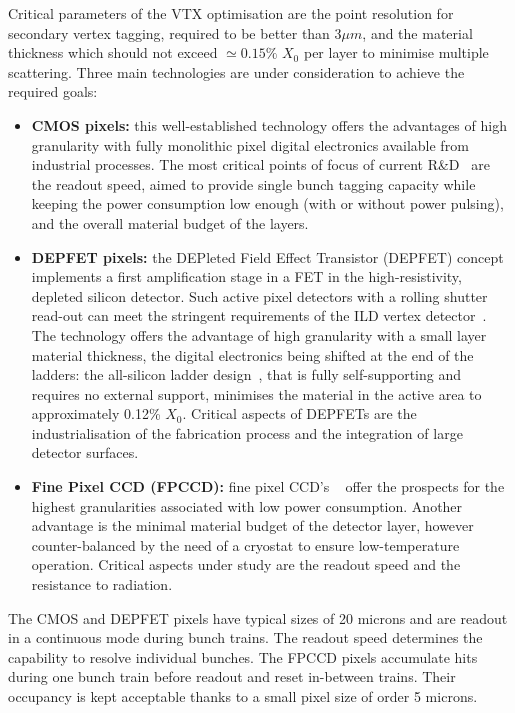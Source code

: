 Critical parameters of the VTX optimisation are the point resolution for secondary vertex tagging, required to be better than 3$\mu m$, and the material thickness which should not exceed $\simeq 0.15\%$ $X_0$ per layer to minimise multiple scattering. Three main technologies are under consideration to achieve the required goals:
\begin{itemize}
    \item {\bf CMOS pixels:} this well-established technology offers the advantages of high granularity with fully monolithic pixel digital electronics available from industrial processes. The most critical points of focus of current R\&D~\cite{Besson:2016ivb} are the readout speed, aimed to provide single bunch tagging capacity while keeping the power consumption low enough (with or without power pulsing), and the overall material budget of the layers.
    \item {\bf DEPFET pixels:} the DEPleted Field Effect Transistor (DEPFET) concept implements a first amplification stage in a FET in the high-resistivity, depleted silicon detector. Such active pixel detectors with a rolling shutter read-out can meet the stringent requirements of the ILD vertex detector~\cite{Alonso:2012ss,Richter:2003dn}. The technology offers the advantage of high granularity with a small layer material thickness, the digital electronics being shifted at the end of the ladders: the all-silicon ladder design~\cite{Andricek:2004cj}, that is fully self-supporting and requires no external support, minimises the material in the active area to approximately 0.12\% $X_{0}$. Critical aspects of DEPFETs are the industrialisation of the fabrication process and the integration of large detector surfaces.
    \item{\bf Fine Pixel CCD (FPCCD):} fine pixel CCD's ~\cite{Paredes:2014kda} offer the prospects for the highest granularities associated with low power consumption. Another advantage is the minimal material budget of the detector layer, however counter-balanced by the need of a cryostat to ensure low-temperature operation. Critical aspects under study are the readout speed and the resistance to radiation.  
\end{itemize}

\vspace{0.5cm}
The CMOS and DEPFET pixels have typical sizes of 20 microns and are readout in a continuous mode during bunch trains. The readout speed determines the capability to resolve individual bunches. The FPCCD pixels accumulate hits during one bunch train before readout and reset in-between trains. Their occupancy is kept acceptable thanks to a small pixel size of order 5 microns.  

